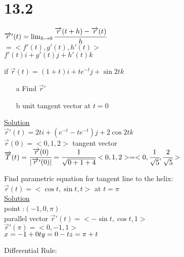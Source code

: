 \section{13.2}
$\overrightarrow{r}'(t)=\lim_{h\to 0}\cfrac{\overrightarrow{r}(t+h)-\overrightarrow{r}(t)}{h}$\\
$=<f'(t),g'(t),h'(t)>$\\
$f'(t)i+g'(t)j+h'(t)k$\\
\noindent{\color{smalt(darkpowderblue)}\rule{\linewidth}{.2mm}}
\begin{example}
if $\overrightarrow{r}(t)=(1+t)i+te^{-t}j+\sin{2t}k$
\begin{itemize}
    \item[a] Find $\overrightarrow{r}'$
    \item[b] unit tangent vector at $t=0$
\end{itemize}
\underline{\textbf{\large}\color{smalt(darkpowderblue)}Solution}\\
$\overrightarrow{r}'(t)=2ti+(e^{-t}-te^{-t})j+2\cos{2t}k$\\
$\overrightarrow{r}(0)=<0,1,2>$ tangent vector \\
$\overrightarrow{T}(t)=\cfrac{\overrightarrow{r}(0)}{|\overrightarrow{r}'(0)|}=\cfrac{1}{\sqrt{0+1+4}}<0,1,2>=<0,\cfrac{1}{\sqrt{5}},\cfrac{2}{\sqrt{5}}>$
\end{example}
\noindent{\color{smalt(darkpowderblue)}\rule{\linewidth}{.2mm}}
\begin{example}
Find parametric equation for tangent line to the helix:\\
$\overrightarrow{r}(t)=<\cos{t},\sin{t},t>$ at $t=\pi$\\
\underline{\textbf{\large}\color{smalt(darkpowderblue)}Solution}\\
point :$(-1,0,\pi)$\\
parallel vector $\overrightarrow{r}'(t)=<-\sin{t},\cos{t},1>$\\
$\overrightarrow{r}'(\pi)=<0,-1,1>$\\
$x=-1+0t\\ y=0-t\\ z=\pi+t$
\end{example}
\noindent{\color{smalt(darkpowderblue)}\rule{\linewidth}{.2mm}}
Differential Rule:
